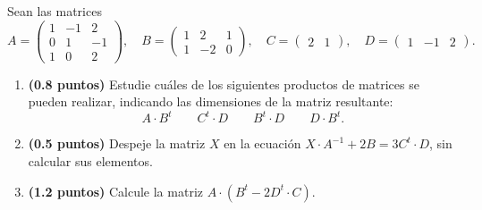 
Sean las matrices
\[
A=\begin{pmatrix}1&-1&2\\0&1&-1\\1&0&2\end{pmatrix},\quad
B=\begin{pmatrix}1&2&1\\1&-2&0\end{pmatrix},\quad
C=\begin{pmatrix}2&1\end{pmatrix},\quad
D=\begin{pmatrix}1&-1&2\end{pmatrix}.
\]
\begin{enumerate}[label=\alph*)]
\item \textbf{(0.8 puntos)} Estudie cuáles de los siguientes productos de matrices se pueden realizar, indicando las dimensiones de la matriz resultante:
\[
A\cdot B^t\qquad C^t\cdot D\qquad B^t\cdot D\qquad D\cdot B^t.
\]
\item \textbf{(0.5 puntos)} Despeje la matriz $X$ en la ecuación $X\cdot A^{-1}+2B=3C^t\cdot D$, sin calcular sus elementos.
\item \textbf{(1.2 puntos)} Calcule la matriz $A\cdot\left(B^t-2D^t\cdot C\right)$.
\end{enumerate}
